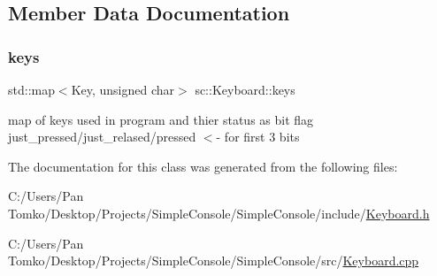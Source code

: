 \subsection{Member Data Documentation}
\mbox{\label{classsc_1_1_keyboard_a58a24371543a41a11455d0d199a2135e}} 
\subsubsection{\texorpdfstring{keys}{keys}}
{\footnotesize\ttfamily std\+::map$<$Key, unsigned char$>$ sc\+::\+Keyboard\+::keys}

map of keys used in program and thier status as bit flag just\+\_\+pressed/just\+\_\+relased/pressed $<$-\/ for first 3 bits 

The documentation for this class was generated from the following files\+:\begin{DoxyCompactItemize}
\item 
C\+:/\+Users/\+Pan Tomko/\+Desktop/\+Projects/\+Simple\+Console/\+Simple\+Console/include/\mbox{\hyperlink{_keyboard_8h}{Keyboard.\+h}}\item 
C\+:/\+Users/\+Pan Tomko/\+Desktop/\+Projects/\+Simple\+Console/\+Simple\+Console/src/\mbox{\hyperlink{_keyboard_8cpp}{Keyboard.\+cpp}}\end{DoxyCompactItemize}
